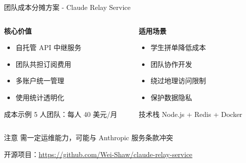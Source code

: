\documentclass[aspectratio=169,xcolor=dvipsnames]{beamer}
\begin{document}
\begin{frame}{团队成本分摊方案 - Claude Relay Service}
  \begin{columns}
    \begin{column}{0.48\textwidth}
      \textbf{核心价值}
      \begin{itemize}
        \item 自托管 API 中继服务
        \item 团队共担订阅费用
        \item 多账户统一管理
        \item 使用统计透明化
      \end{itemize}

      \vspace{0.3cm}

      \begin{block}{成本示例}
        5 人团队：每人 40 美元/月
      \end{block}
    \end{column}
    \begin{column}{0.48\textwidth}
      \textbf{适用场景}
      \begin{itemize}
        \item 学生拼单降低成本
        \item 团队协作开发
        \item 绕过地理访问限制
        \item 保护数据隐私
      \end{itemize}

      \vspace{0.3cm}

      \begin{exampleblock}{技术栈}
        Node.js + Redis + Docker
      \end{exampleblock}
    \end{column}
  \end{columns}

  \vspace{0.3cm}

  \begin{alertblock}{注意}
    需一定运维能力，可能与 Anthropic 服务条款冲突
  \end{alertblock}

  \vspace{0.2cm}

  \begin{center}
    开源项目：\url{https://github.com/Wei-Shaw/claude-relay-service}
  \end{center}
\end{frame}
\end{document}
